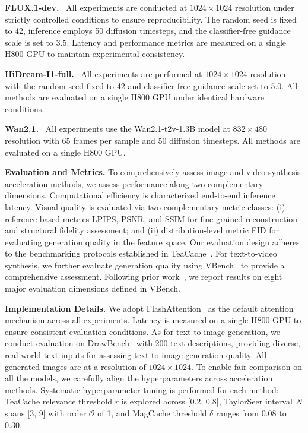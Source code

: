 \textbf{FLUX.1-dev.}~\cite{flux2024}
All experiments are conducted at $1024\times1024$ resolution
under strictly controlled conditions to ensure reproducibility.
The random seed is fixed to 42,
inference employs 50 diffusion timesteps,
and the classifier-free guidance scale is set to 3.5.
Latency and performance metrics are measured on a single H800 GPU
to maintain experimental consistency.

\textbf{HiDream-I1-full.}~\cite{hidreami1technicalreport}
All experiments are performed at $1024\times1024$ resolution
with the random seed fixed to 42 and classifier-free guidance scale set to 5.0.
All methods are evaluated on a single H800 GPU
under identical hardware conditions.

\textbf{Wan2.1.}~\cite{wan2025}
All experiments use the Wan2.1-t2v-1.3B model
at $832\times480$ resolution with 65 frames per sample
and 50 diffusion timesteps.
All methods are evaluated on a single H800 GPU.


\textbf{Evaluation and Metrics.}
To comprehensively assess image and video synthesis acceleration methods,
we assess performance
along two complementary dimensions.
Computational efficiency is characterized
end-to-end inference latency.
Visual quality is evaluated
via two complementary metric classes:
(i) reference-based metrics LPIPS, PSNR, and SSIM
for fine-grained reconstruction and structural fidelity assessment;
and (ii) distribution-level metric FID
for evaluating generation quality in the feature space.
Our evaluation design adheres to the benchmarking protocols
established in TeaCache~\cite{liu2024timestep}.
For text-to-video synthesis, we further evaluate generation quality
using VBench~\cite{huang2023vbench} to provide a comprehensive assessment.
Following prior work~\cite{ren2024consisti2v},
we report results on eight major evaluation dimensions defined in VBench.

\textbf{Implementation Details.}
We adopt FlashAttention~\cite{dao2023flashattention2}
as the default attention mechanism
across all experiments.
Latency is measured on a single H800 GPU
to ensure consistent evaluation conditions.
As for text-to-image generation,
we conduct evaluation
on DrawBench~\cite{saharia2022photorealistic} with 200 text descriptions,
providing diverse, real-world text inputs
for assessing text-to-image generation quality.
All generated images
are at a resolution of \(1024 \times 1024\).
To enable fair comparison on all the models,
we carefully align the hyperparameters
across acceleration methods.
Systematic hyperparameter tuning is performed for each method:
TeaCache relevance threshold $r$ is explored
across [0.2, 0.8],
TaylorSeer interval $\mathcal{N}$ spans [3, 9] with order $\mathcal{O}$ of 1,
and MagCache threshold $\delta$ ranges from 0.08 to 0.30.

